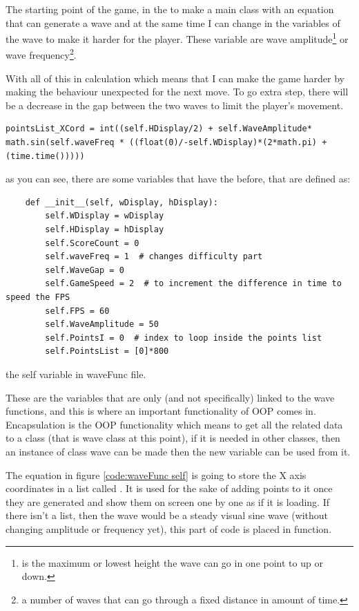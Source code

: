 The starting point of the game, in the  to make a main class  with an equation that can generate a wave and at the same time I can change in the variables of the wave to make it harder for the player. These variable are wave amplitude\footnote{is the maximum or lowest height the wave can go in one point to up or down.} or wave frequency\footnote{a number of waves that can go through a fixed distance in amount of time.}.

With all of this in calculation which means that I can make the game harder by making the behaviour unexpected for the next move. To go extra step, there will be a decrease in the gap between the two waves to limit the player's movement.

\begin{verbatim}
pointsList_XCord = int((self.HDisplay/2) + self.WaveAmplitude* math.sin(self.waveFreq * ((float(0)/-self.WDisplay)*(2*math.pi) + (time.time()))))
\end{verbatim}
as you can see, there are some variables that have the  before, that are defined as:

\begin{listing}[!ht]
\begin{verbatim}
	def __init__(self, wDisplay, hDisplay):
		self.WDisplay = wDisplay
		self.HDisplay = hDisplay
		self.ScoreCount = 0  
		self.waveFreq = 1  # changes difficulty part
		self.WaveGap = 0
		self.GameSpeed = 2  # to increment the difference in time to speed the FPS
		self.FPS = 60
		self.WaveAmplitude = 50
		self.PointsI = 0  # index to loop inside the points list
		self.PointsList = [0]*800
\end{verbatim}
\caption{the self variable in waveFunc file.}
\label{code:waveFunc self}
\end{listing}


These are the variables that are only (and not specifically) linked to the wave functions, and this is where an important functionality of OOP comes in. Encapsulation is the OOP functionality which means to get all the related data to a class (that is wave class at this point), if it is needed in other classes, then an instance of class wave can be made then the new variable can be used from it.

The equation in figure \ref{code:waveFunc self} is going to store the X axis coordinates in a list called . It is used for the sake of adding points to it once they are generated and show them on screen one by one as if it is loading. If there isn't a list, then the wave would be a steady visual sine wave (without changing amplitude or frequency yet), this part of code is placed in  function.

